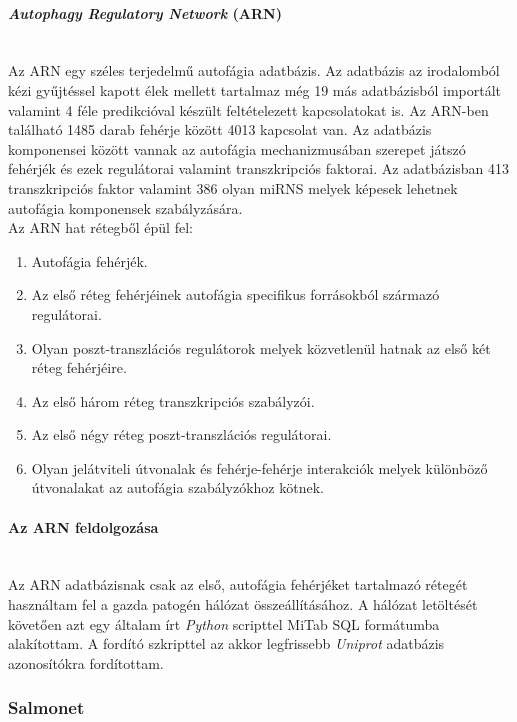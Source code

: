 \documentclass[a4paper,12pt]{article}
\begin{document}
			\paragraph{\textit{Autophagy Regulatory Network} (ARN)} \mbox{}\\
			Az ARN egy széles terjedelmű autofágia adatbázis. Az adatbázis az irodalomból kézi gyűjtéssel kapott élek mellett tartalmaz még 19 más adatbázisból importált valamint 4 féle predikcióval készült feltételezett kapcsolatokat is. Az ARN-ben található 1485 darab fehérje között 4013 kapcsolat van. Az adatbázis komponensei között vannak az autofágia mechanizmusában szerepet játszó fehérjék és ezek regulátorai valamint transzkripciós faktorai. Az adatbázisban 413 transzkripciós faktor valamint 386 olyan miRNS melyek képesek lehetnek autofágia komponensek szabályzására.\cite{ARN} \\
			Az ARN hat rétegből épül fel:
			\begin{enumerate}
				\item Autofágia fehérjék.
				\item Az első réteg fehérjéinek autofágia specifikus forrásokból származó regulátorai.
				\item Olyan poszt-transzlációs regulátorok melyek közvetlenül hatnak az első két réteg fehérjéire.
				\item Az első három réteg transzkripciós szabályzói.
				\item Az első négy réteg poszt-transzlációs regulátorai.
				\item Olyan jelátviteli útvonalak és fehérje-fehérje interakciók melyek különböző útvonalakat az autofágia szabályzókhoz kötnek.
			\end{enumerate} \cite{ARN}
			
			\paragraph{Az ARN feldolgozása} \mbox{}\\
			Az ARN adatbázisnak csak az első, autofágia fehérjéket tartalmazó rétegét használtam fel a gazda patogén hálózat összeállításához. A hálózat letöltését követően azt egy általam írt \textit{Python} scripttel MiTab SQL formátumba alakítottam. A fordító szkripttel az akkor legfrissebb \textit{Uniprot} adatbázis azonosítókra fordítottam.
		
		\subsubsection{Salmonet}
\end{document}
